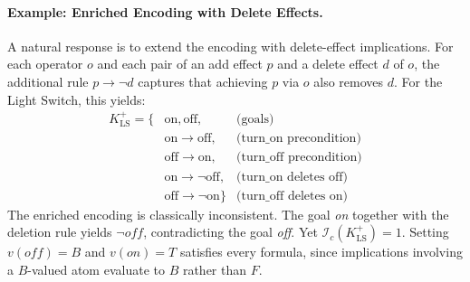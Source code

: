 \paragraph{Example: Enriched Encoding with Delete Effects.} A natural response is to extend the encoding with delete-effect implications. For each operator $o$ and each pair of an add effect $p$ and a delete effect $d$ of $o$, the additional rule $p \rightarrow \neg d$ captures that achieving $p$ via $o$ also removes $d$. For the Light Switch, this yields:
\begin{align*}
    K^+_{\text{LS}} = \{ & \text{on}, \text{off},                  & \text{(goals)}                  \\
                         & \text{on} \rightarrow \text{off},       & \text{(turn\_on precondition)}  \\
                         & \text{off} \rightarrow \text{on},       & \text{(turn\_off precondition)} \\
                         & \text{on} \rightarrow \neg\text{off},   & \text{(turn\_on deletes off)}   \\
                         & \text{off} \rightarrow \neg\text{on} \} & \text{(turn\_off deletes on)}
\end{align*}
The enriched encoding is classically inconsistent. The goal \textit{on} together with the deletion rule yields $\neg\textit{off}$, contradicting the goal \textit{off}. Yet $\mathcal{I}_c(K^+_{\text{LS}}) = 1$. Setting \mbox{$v(\textit{off}) = B$} and $v(\textit{on}) = T$ satisfies every formula, since implications involving a $B$-valued atom evaluate to $B$ rather than $F$.

